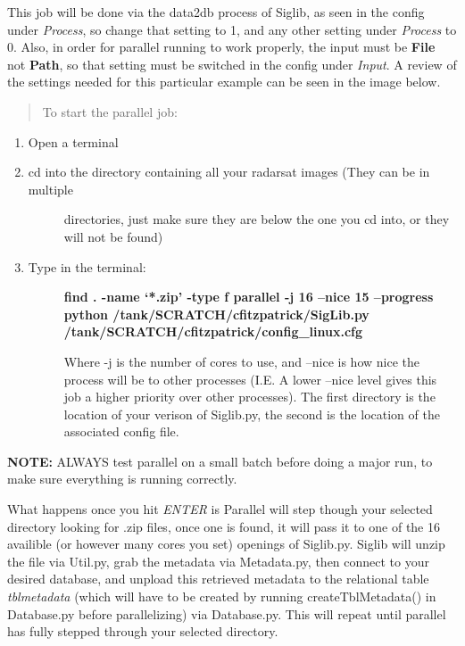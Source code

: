 \documentclass[letterpaper,10pt,openany,oneside]{sphinxmanual}
\begin{document}
This job will be done via the data2db process of Siglib, as seen in the
config under \emph{Process}, so change that setting to 1, and any other setting under
\emph{Process} to 0. Also, in order for parallel running to work properly, the input
must be \textbf{File} not \textbf{Path}, so that setting must be switched in the config
under \emph{Input}. A review of the settings needed for this particular example can be
seen in the image below.
\begin{quote}

To start the parallel job:
\end{quote}
\begin{enumerate}
\item {} 
Open a terminal

\item {} \begin{description}
\item[{cd into the directory containing all your radarsat images (They can be in multiple}] \leavevmode
directories, just make sure they are below the one you cd into, or they will
not be found)

\end{description}

\item {} \begin{description}
\item[{Type in the terminal:}] \leavevmode
\textbf{find . -name `*.zip' -type f \textbar{} parallel -j 16 --nice 15 --progress python /tank/SCRATCH/cfitzpatrick/SigLib.py /tank/SCRATCH/cfitzpatrick/config\_linux.cfg}

Where -j is the number of cores to use, and --nice is how nice the process will be to
other processes (I.E. A lower --nice level gives this job a higher priority over
other processes). The first directory is the location of your verison of Siglib.py,
the second is the location of the associated config file.

\end{description}

\end{enumerate}

\textbf{NOTE:} ALWAYS test parallel on a small batch before doing a major run, to make
sure everything is running correctly.

What happens once you hit \emph{ENTER} is Parallel will step though your selected
directory looking for .zip files, once one is found, it will pass it to one of the
16 availible (or however many cores you set) openings of Siglib.py. Siglib will
unzip the file via Util.py, grab the metadata via Metadata.py, then connect to your
desired database, and unpload this retrieved metadata to the relational table
\emph{tblmetadata} (which will have to be created by running createTblMetadata() in
Database.py before parallelizing) via Database.py. This will repeat until parallel has
fully stepped through your selected directory.
\end{document}
